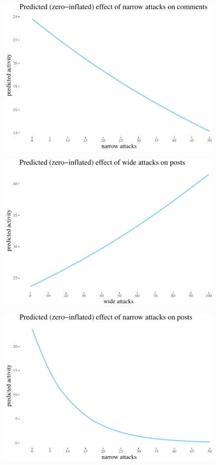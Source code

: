 \documentclass[a4paper,fleqn]{cas-dc}
\begin{document}
\begin{figure}

\begin{center}\includegraphics[width=0.85\linewidth]{images/unnamed-chunk-53-1} \end{center}
\end{figure}

\begin{figure}

\begin{center}\includegraphics[width=0.85\linewidth]{images/unnamed-chunk-54-1} \end{center}
\end{figure}

\begin{figure}

\begin{center}\includegraphics[width=0.85\linewidth]{images/unnamed-chunk-55-1} \end{center}
\end{figure}
\end{document}
